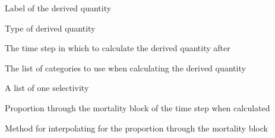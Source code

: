 
 {Label of the derived quantity}

 {Type of derived quantity}

 {The time step in which to calculate the derived quantity after}

 {The list of categories to use when calculating the derived quantity}

 {A list of one selectivity}

 {Proportion through the mortality block of the time step when calculated}

 {Method for interpolating for the proportion through the mortality block}

\subsubsection[Abundance]{}

\subsubsection[Biomass]{}

